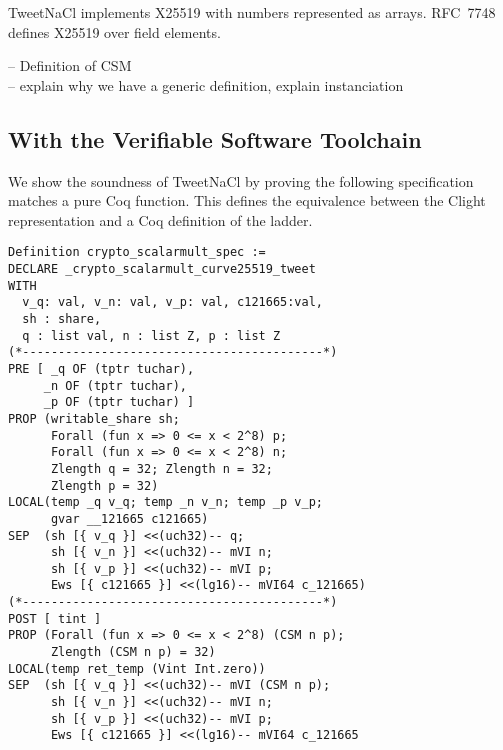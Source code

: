 TweetNaCl implements X25519 with numbers represented as arrays.
RFC~7748 defines X25519 over field elements.

\noindent
-- Definition of  CSM\\
-- explain why we have a generic definition, explain instanciation



\subsection{With the Verifiable Software Toolchain}
\label{subsec:with-VST}

We show the soundness of TweetNaCl by proving the following specification matches a pure Coq function. %
This defines the equivalence between the Clight representation and a Coq definition of the ladder.

\begin{lstlisting}[language=CoqVST]
Definition crypto_scalarmult_spec :=
DECLARE _crypto_scalarmult_curve25519_tweet
WITH
  v_q: val, v_n: val, v_p: val, c121665:val,
  sh : share,
  q : list val, n : list Z, p : list Z
(*------------------------------------------*)
PRE [ _q OF (tptr tuchar),
     _n OF (tptr tuchar),
     _p OF (tptr tuchar) ]
PROP (writable_share sh;
      Forall (fun x => 0 <= x < 2^8) p;
      Forall (fun x => 0 <= x < 2^8) n;
      Zlength q = 32; Zlength n = 32;
      Zlength p = 32)
LOCAL(temp _q v_q; temp _n v_n; temp _p v_p;
      gvar __121665 c121665)
SEP  (sh [{ v_q }] <<(uch32)-- q;
      sh [{ v_n }] <<(uch32)-- mVI n;
      sh [{ v_p }] <<(uch32)-- mVI p;
      Ews [{ c121665 }] <<(lg16)-- mVI64 c_121665)
(*------------------------------------------*)
POST [ tint ]
PROP (Forall (fun x => 0 <= x < 2^8) (CSM n p);
      Zlength (CSM n p) = 32)
LOCAL(temp ret_temp (Vint Int.zero))
SEP  (sh [{ v_q }] <<(uch32)-- mVI (CSM n p);
      sh [{ v_n }] <<(uch32)-- mVI n;
      sh [{ v_p }] <<(uch32)-- mVI p;
      Ews [{ c121665 }] <<(lg16)-- mVI64 c_121665
\end{lstlisting}

